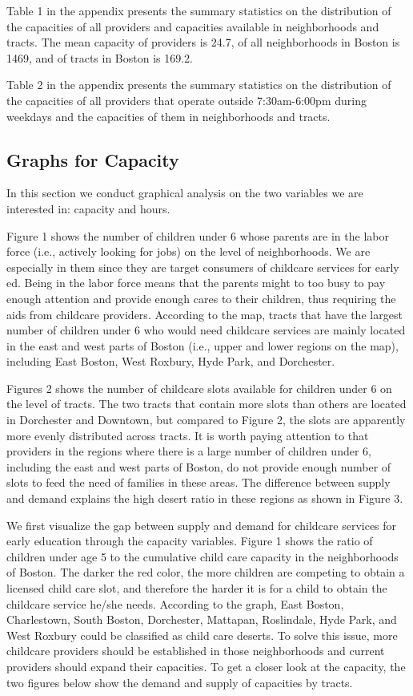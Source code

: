 \documentclass[man]{apa6}
\begin{document}
Table 1 in the appendix presents the summary statistics on the
distribution of the capacities of all providers and capacities available
in neighborhoods and tracts. The mean capacity of providers is 24.7, of
all neighborhoods in Boston is 1469, and of tracts in Boston is 169.2.

Table 2 in the appendix presents the summary statistics on the
distribution of the capacities of all providers that operate outside
7:30am-6:00pm during weekdays and the capacities of them in
neighborhoods and tracts.

\subsection{Graphs for Capacity}\label{graphs-for-capacity}

In this section we conduct graphical analysis on the two variables we
are interested in: capacity and hours.

Figure 1 shows the number of children under 6 whose parents are in the
labor force (i.e., actively looking for jobs) on the level of
neighborhoods. We are especially in them since they are target consumers
of childcare services for early ed. Being in the labor force means that
the parents might to too busy to pay enough attention and provide enough
cares to their children, thus requiring the aids from childcare
providers. According to the map, tracts that have the largest number of
children under 6 who would need childcare services are mainly located in
the east and west parts of Boston (i.e., upper and lower regions on the
map), including East Boston, West Roxbury, Hyde Park, and Dorchester.

Figures 2 shows the number of childcare slots available for children
under 6 on the level of tracts. The two tracts that contain more slots
than others are located in Dorchester and Downtown, but compared to
Figure 2, the slots are apparently more evenly distributed across
tracts. It is worth paying attention to that providers in the regions
where there is a large number of children under 6, including the east
and west parts of Boston, do not provide enough number of slots to feed
the need of families in these areas. The difference between supply and
demand explains the high desert ratio in these regions as shown in
Figure 3.

We first visualize the gap between supply and demand for childcare
services for early education through the capacity variables. Figure 1
shows the ratio of children under age 5 to the cumulative child care
capacity in the neighborhoods of Boston. The darker the red color, the
more children are competing to obtain a licensed child care slot, and
therefore the harder it is for a child to obtain the childcare service
he/she needs. According to the graph, East Boston, Charlestown, South
Boston, Dorchester, Mattapan, Roslindale, Hyde Park, and West Roxbury
could be classified as child care deserts. To solve this issue, more
childcare providers should be established in those neighborhoods and
current providers should expand their capacities. To get a closer look
at the capacity, the two figures below show the demand and supply of
capacities by tracts.
\end{document}
